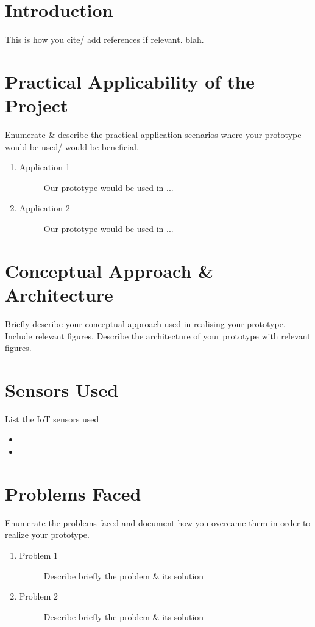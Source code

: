 \documentclass[
10pt, %
a4paper, %
oneside, %
headinclude,footinclude, %
BCOR5mm, %
]{scrartcl}
\begin{document}

\section{Introduction}
This is how you cite/ add references if relevant. blah\cite{qrygraph}.

\section{Practical Applicability of the Project}
Enumerate  \& describe  the practical application scenarios where your prototype would be used/ would be beneficial.
\begin{enumerate}
\item 
	\begin{description}
	\item[Application 1] Our prototype would be used in ...
	\end{description}
	\item 
	\begin{description}
	\item[Application 2] Our prototype would be used in ...
	\end{description}
\end{enumerate}

\section{Conceptual Approach \& Architecture}
Briefly describe your conceptual approach used in realising your prototype. Include relevant figures. Describe the architecture of your prototype with relevant figures.

\section{Sensors Used}
List the IoT sensors used 
\begin{itemize}
\item 
\item 
\end{itemize}


\section{Problems Faced}
Enumerate the problems faced and document how you overcame them in order to realize your prototype.
\begin{enumerate}
\item 
	\begin{description}
	\item[Problem 1] Describe briefly the problem \& its solution
	\end{description}
	\item 
	\begin{description}
	\item[Problem 2] Describe briefly the problem \& its solution
	\end{description}
\end{enumerate}
\end{document}
